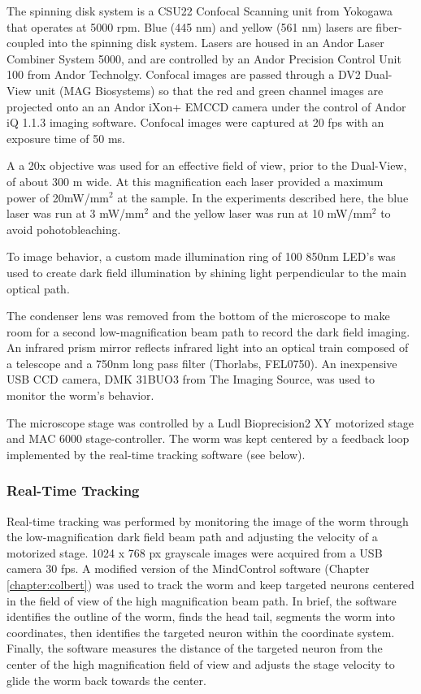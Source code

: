 The spinning disk system is a CSU22 Confocal Scanning unit from Yokogawa that operates at 5000 rpm. Blue (445 nm) and yellow (561 nm) lasers are fiber-coupled into the spinning disk system. Lasers are housed in an  Andor Laser Combiner System 5000, and are controlled by an Andor Precision Control Unit 100 from Andor Technolgy. Confocal images are passed through a DV2 Dual-View  unit (MAG Biosystems) so that the red and green channel images are projected onto an an Andor iXon+ EMCCD camera under the control of Andor iQ 1.1.3 imaging software. Confocal images were captured at 20 fps with an exposure time of 50 ms. 

 A a 20x objective was used for an effective field of view, prior to the Dual-View, of about 300 \textmu m wide. At this magnification each laser  provided a maximum power of 20mW/mm$^2$ at the sample. In the experiments described here, the blue laser was run at 3 mW/mm$^2$ and the yellow laser was run at 10 mW/mm$^2$ to avoid pohotobleaching.

To image behavior, a custom made illumination ring of 100 850nm LED's was used to create dark field illumination by shining light  perpendicular to the main optical path. 

The condenser lens was removed from the bottom of the microscope to make room for a second low-magnification beam path to record the dark field imaging. An infrared prism mirror reflects infrared light into an optical train composed of a telescope and a 750nm long pass filter (Thorlabs, FEL0750).  An inexpensive USB CCD camera, DMK 31BUO3 from The Imaging Source,  was used to monitor the worm's behavior.  

The microscope stage was controlled by a Ludl Bioprecision2 XY motorized stage and MAC 6000 stage-controller. The worm was kept centered by a  feedback loop implemented by the real-time tracking software (see below).

\subsubsection{Real-Time Tracking} \label{sec:omegaSoftware}
Real-time tracking was performed by monitoring the image of the worm through the low-magnification dark field beam path and adjusting the velocity of a motorized stage. 1024 x 768 px grayscale images were acquired from a USB camera 30 fps. A modified version of the MindControl software (Chapter \ref{chapter:colbert}) was used to track the worm and keep targeted neurons centered in the field of view of the high magnification beam path. In brief, the software identifies the outline of the worm, finds the head tail, segments the worm into coordinates, then identifies the targeted neuron within the coordinate system. Finally, the software measures the distance of the targeted neuron from the center of the high magnification field of view and adjusts the stage velocity to glide the worm back towards the center.

